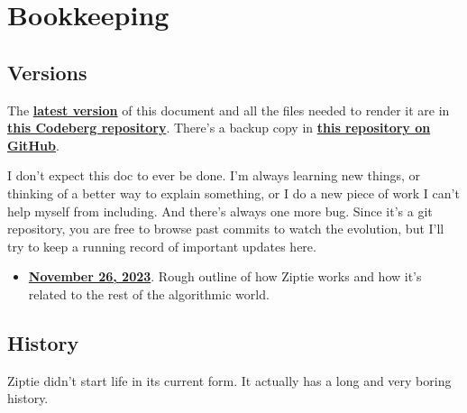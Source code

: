 \section{Bookkeeping}
\label{sec:bookkeeping}

\subsection{Versions}
\label{subsec:versions}

The \textbf{\href{
https://codeberg.org/brohrer/how-to-train-your-robot/raw/branch/main/chapter_9/ziptie.pdf}
{latest version}}
of this document and all the files needed to
render it are in \textbf{\href{
https://codeberg.org/brohrer/how-to-train-your-robot/src/branch/main/chapter_9}
{this Codeberg repository}}. There's a backup copy in \textbf{
\href{https://github.com/brohrer/how-to-train-your-robot/tree/main/chapter_9}
{this repository on GitHub}}.

I don't expect this doc to ever be done. I'm always learning new things,
or thinking of a better way to explain something, or I do a new
piece of work I can't help myself from including. And there's always
one more bug.
Since it's a git repository, you are free to browse past commits to watch
the evolution, but I'll try to keep a running record of important updates
here.

\begin{itemize}
\item{\textbf{\href{}{November 26, 2023}}. Rough outline of how Ziptie works
and how it's related to the rest of the algorithmic world.}
\end{itemize}

\subsection{History}
\label{subsec:history}

Ziptie didn't start life in its current form. It actually has a long
and very boring history.

